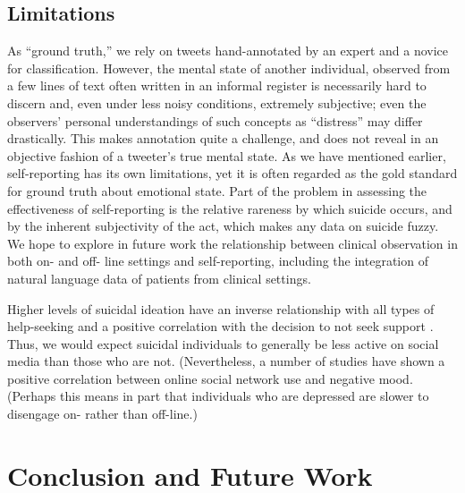 \documentclass[11pt]{article}
\begin{document}
\subsection{Limitations}
As ``ground truth,'' we rely on tweets hand-annotated by an expert and a novice for classification. However, the mental state of another individual, observed from a few lines of text  often written in an informal register is necessarily hard to discern and, even under less noisy conditions, extremely subjective; even the observers' personal understandings of such concepts as ``distress'' may differ drastically. This makes annotation quite a challenge, and does not reveal in an objective fashion of a tweeter's true mental state. As we have mentioned earlier, self-reporting has its own limitations, yet it is often regarded as the gold standard for ground truth about emotional state.
Part of the problem in assessing the effectiveness of self-reporting is the relative rareness by which suicide occurs, and by the inherent subjectivity of the act, which makes any data on suicide fuzzy. We hope to explore in future work the relationship between clinical observation in both on- and off- line settings and self-reporting, including the integration of natural language data of patients from clinical settings.


Higher levels of suicidal ideation have an inverse relationship with all types of help-seeking and a positive correlation with the decision to not seek support \cite{deane2001suicidal}. Thus, we would expect suicidal individuals to generally be less active on social media than those who are not. (Nevertheless, a number of studies have shown a positive correlation between online social network use and negative mood. (Perhaps this means in part that individuals who are depressed are slower to disengage on- rather than off-line.)
 

\section{Conclusion and Future Work}

\end{document}
